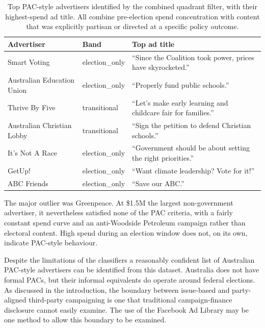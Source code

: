 \documentclass[11pt,a4paper]{article}
\begin{document}
\begin{table}[H]
  \centering
  \small
  \begin{tabular}{lll}
    \toprule
    \textbf{Advertiser} & \textbf{Band} & \textbf{Top ad title} \\
    \midrule
    Smart Voting               & election\_only & ``Since the Coalition took power, prices have skyrocketed.'' \\
    Australian Education Union & election\_only & ``Properly fund public schools.'' \\
    Thrive By Five             & transitional   & ``Let's make early learning and childcare fair for families.'' \\
    Australian Christian Lobby & transitional   & ``Sign the petition to defend Christian schools.'' \\
    It's Not A Race            & election\_only & ``Government should be about setting the right priorities.'' \\
    GetUp!                     & election\_only & ``Want climate leadership? Vote for it!'' \\
    ABC Friends                & election\_only & ``Save our ABC.'' \\
    \bottomrule
  \end{tabular}
  \caption{Top PAC-style advertisers identified by the combined quadrant filter, with their highest-spend ad title. All combine pre-election spend concentration with content that was explicitly partisan or directed at a specific policy outcome.}
  \label{tab:top-pacs}
\end{table}

The major outlier was Greenpeace. At \$1.5M the largest non-government advertiser, it nevertheless satisfied none of the PAC criteria, with a fairly constant spend curve and an anti-Woodside Petroleum campaign rather than electoral content. High spend during an election window does not, on its own, indicate PAC-style behaviour.

Despite the limitations of the classifiers a reasonably confident list of Australian PAC-style advertisers can be identified from this dataset. Australia does not have formal PACs, but their informal equivalents do operate around federal elections. As discussed in the introduction, the boundary between issue-based and party-aligned third-party campaigning is one that traditional campaign-finance disclosure cannot easily examine. The use of the Facebook Ad Library may be one method to allow this boundary to be examined.
\end{document}
